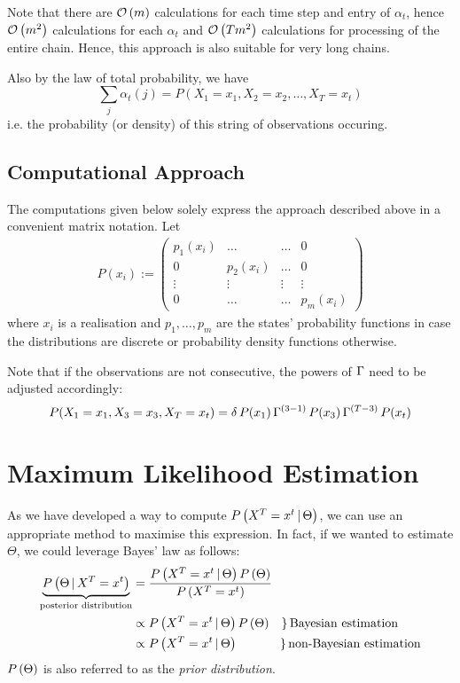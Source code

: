 Note that there are $\mathcal{O}\left(m\right)$ calculations for each time step and entry of $\alpha_t$, hence $\mathcal{O}\left(m^2\right)$ calculations for each $\alpha_t$ and $\mathcal{O}\left(T m^2\right)$ calculations for processing of the entire chain. Hence, this approach is also suitable for very long chains.
 
Also by the law of total probability, we have
\[
\sum_j \alpha_t(j) = P\left(X_1 = x_1, X_2 = x_2, \dots, X_T = x_t \right)
\] 
i.e. the probability (or density) of this string of observations occuring. 


\subsection{Computational Approach}

The computations given below solely express the approach described above in a convenient matrix notation. 
Let 
\begin{align*}
	P(x_i) := \begin{pmatrix}
		p_1(x_i) & \dots    & \dots & 0  \\
		0        & p_2(x_i) & \dots & 0  \\
		\vdots   & \vdots   & \vdots& \vdots \\ 
		0        & \dots    & \dots & p_m(x_i)
	\end{pmatrix}
\end{align*}
where $x_i$ is a realisation and $p_1, \dots, p_m$ are the states' probability functions in case the distributions are discrete or probability density functions otherwise. 


Note that if the observations are not consecutive, the powers of $\Gamma$ need to be adjusted accordingly:
\[
P(X_1 = x_1, X_3 = x_3, X_T = x_t) = \delta \,  P(x_1) \, \Gamma^{(3-1)} \,  P(x_3) \,  \Gamma^{(T-3)} \, P(x_t)
\]



\section{Maximum Likelihood Estimation}

As we have developed a way to compute $P\left(X^T=x^t \, | \, \Theta\right)$, we can use an appropriate method to maximise this expression. In fact, if we wanted to estimate $\Theta$, we could leverage Bayes' law as follows:
\begin{align}
	\underbrace{P\left(\Theta \, | \, X^T=x^t\right)}_{\text{posterior distribution}} &= \frac{P\left(X^T=x^t \, | \, \Theta\right) P \left(\Theta\right)}{P \left(X^T=x^t\right)} \\
		&\propto P\left(X^T=x^t \, | \, \Theta\right) P \left(\Theta\right)  \quad \} \, \text{Bayesian estimation} \\
		&\propto P\left(X^T=x^t \, | \, \Theta\right) \quad \quad \quad \; \; \} \, \text{non-Bayesian estimation}
	\label{bay_estimate}
\end{align}
$P \left(\Theta\right)$ is also referred to as the \textit{prior distribution}.

